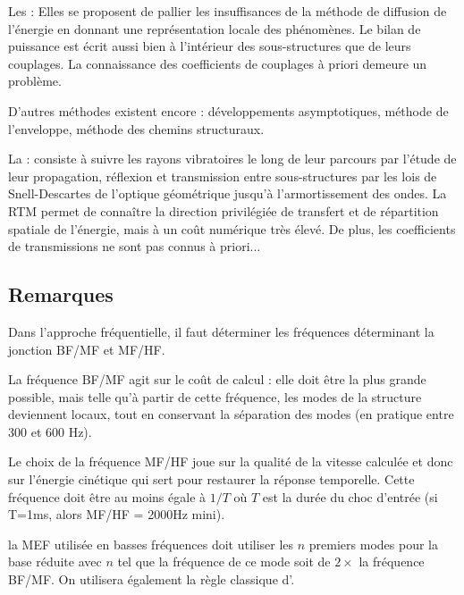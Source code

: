 \bigskip
Les : 
Elles se proposent de pallier les insuffisances de la méthode de diffusion de l'énergie
en donnant une représentation locale des phénomènes. Le bilan de puissance est
écrit aussi bien à l'intérieur des sous-structures que de leurs couplages.
La connaissance des coefficients de couplages à priori demeure un problème.

\bigskip
D'autres méthodes existent encore : développements asymptotiques,
méthode de l'enveloppe, méthode des chemins structuraux.

La : 
consiste à suivre les rayons vibratoires le long
de leur parcours par l'étude de leur propagation, réflexion et transmission
entre sous-structures par les lois de Snell-Descartes 
de l'optique géométrique jusqu'à l'armortissement des ondes.
La RTM permet de connaître la direction privilégiée de transfert et de
répartition spatiale de l'énergie, mais à un coût numérique très
élevé. De plus, les coefficients de transmissions ne sont pas connus à priori...

\medskip
\subsection{Remarques}

Dans l'approche fréquentielle, il faut déterminer les fréquences déterminant
la jonction BF/MF et MF/HF.

La fréquence BF/MF agit sur le coût de calcul : elle doit être la plus grande possible, mais
telle qu'à partir de cette fréquence, les modes de la structure deviennent locaux, 
tout en conservant la séparation des modes (en pratique entre 300 et 600 Hz).

Le choix de la fréquence MF/HF joue sur la qualité de la vitesse calculée
et donc sur l'énergie cinétique qui sert pour restaurer la réponse
temporelle. Cette fréquence doit être au moins égale à $1/T$ où
$T$ est la durée du choc d'entrée (si T=1ms, alors MF/HF = 2000Hz mini).

la MEF utilisée en basses fréquences doit utiliser les $n$ premiers modes pour la base réduite
avec $n$ tel que la fréquence de ce mode soit de $2\times$ la fréquence BF/MF.
On utilisera également la règle classique d'.

